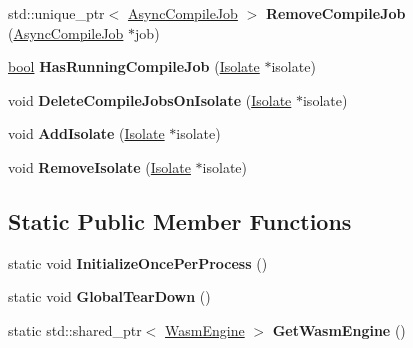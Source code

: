 \begin{DoxyCompactItemize}
\item 
\mbox{\label{classv8_1_1internal_1_1wasm_1_1WasmEngine_a8378f5ecdd236147a0b3c590c12899b8}} 
std\+::unique\+\_\+ptr$<$ \mbox{\hyperlink{classv8_1_1internal_1_1wasm_1_1AsyncCompileJob}{Async\+Compile\+Job}} $>$ {\bfseries Remove\+Compile\+Job} (\mbox{\hyperlink{classv8_1_1internal_1_1wasm_1_1AsyncCompileJob}{Async\+Compile\+Job}} $\ast$job)
\item 
\mbox{\label{classv8_1_1internal_1_1wasm_1_1WasmEngine_ab6afdb3fea4c987fb6d9d515c5faa630}} 
\mbox{\hyperlink{classbool}{bool}} {\bfseries Has\+Running\+Compile\+Job} (\mbox{\hyperlink{classv8_1_1internal_1_1Isolate}{Isolate}} $\ast$isolate)
\item 
\mbox{\label{classv8_1_1internal_1_1wasm_1_1WasmEngine_aa103ab294ff94d0c588ea065e30e7038}} 
void {\bfseries Delete\+Compile\+Jobs\+On\+Isolate} (\mbox{\hyperlink{classv8_1_1internal_1_1Isolate}{Isolate}} $\ast$isolate)
\item 
\mbox{\label{classv8_1_1internal_1_1wasm_1_1WasmEngine_af7ca4a2df3e7f8a56c31571ade78372e}} 
void {\bfseries Add\+Isolate} (\mbox{\hyperlink{classv8_1_1internal_1_1Isolate}{Isolate}} $\ast$isolate)
\item 
\mbox{\label{classv8_1_1internal_1_1wasm_1_1WasmEngine_adb290a299b20f78b6b32641fc21325c5}} 
void {\bfseries Remove\+Isolate} (\mbox{\hyperlink{classv8_1_1internal_1_1Isolate}{Isolate}} $\ast$isolate)
\end{DoxyCompactItemize}
\subsection*{Static Public Member Functions}
\begin{DoxyCompactItemize}
\item 
\mbox{\label{classv8_1_1internal_1_1wasm_1_1WasmEngine_a0dc3794ded31c3d4f26cb020d2ffe332}} 
static void {\bfseries Initialize\+Once\+Per\+Process} ()
\item 
\mbox{\label{classv8_1_1internal_1_1wasm_1_1WasmEngine_a3bda543358e208aec76ae5da75d96eb2}} 
static void {\bfseries Global\+Tear\+Down} ()
\item 
\mbox{\label{classv8_1_1internal_1_1wasm_1_1WasmEngine_a55249e6f91a12de658b138623593421b}} 
static std\+::shared\+\_\+ptr$<$ \mbox{\hyperlink{classv8_1_1internal_1_1wasm_1_1WasmEngine}{Wasm\+Engine}} $>$ {\bfseries Get\+Wasm\+Engine} ()
\end{DoxyCompactItemize}



